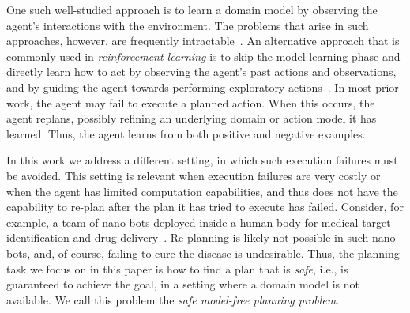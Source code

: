 \documentclass{article}
\begin{document}
	One such well-studied approach is to learn a domain model by observing the agent's interactions with the environment. The problems that arise in such approaches, however, are frequently intractable~\cite{kearns1994,daniely2016}. An alternative approach
	that is commonly used in {\em reinforcement learning} is to skip the model-learning phase and directly learn how to act by observing the agent's past actions and observations, and by guiding the agent towards performing exploratory actions~\cite[inter alia]{kearns2002}. In most prior work, the agent may fail to execute a planned action. When this occurs, the agent replans, possibly refining an underlying domain or action model it has learned. Thus, the agent learns from both positive and negative examples. 
	
	
	
	
	In this work we address a different setting, in which such execution failures must be avoided. This setting is relevant when execution failures are very costly 
	or when the agent has limited computation capabilities, 
    and thus does not have the capability to re-plan after the plan it has tried to execute has failed.
	Consider, for example, a team of nano-bots deployed inside a human body for medical target identification and drug delivery~\cite{cavalcanti2007nanorobot}. Re-planning is likely not possible in such nano-bots, and, of course, failing to cure the disease is undesirable. Thus, the planning task we focus on in this paper is how to find a plan that is {\em safe}, i.e., is guaranteed to achieve the goal, in a setting where a domain model is not available. We call this problem the {\em safe model-free planning problem}. 
	
	
\end{document}
